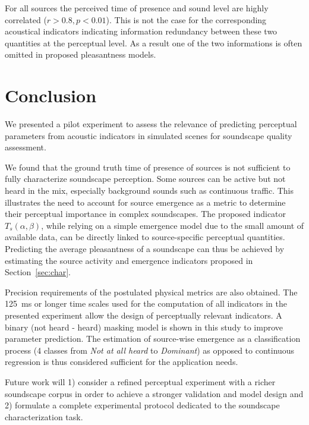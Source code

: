 \documentclass{article}
\begin{document}
\begin{sloppy}
For all sources the perceived time of presence and sound level are highly correlated ($r>0.8, p<0.01$). This is not the case for the corresponding acoustical indicators indicating information redundancy between these two quantities at the perceptual level. As a result one of the two informations is often omitted in proposed pleasantness models.

\section{Conclusion}
\label{sec:disc}

We presented a pilot experiment to assess the relevance of predicting perceptual parameters from acoustic indicators in simulated scenes for soundscape quality assessment.

We found that the ground truth time of presence of sources is not sufficient to fully characterize soundscape perception. Some sources can be active but not heard in the mix, especially background sounds such as continuous traffic. This illustrates the need to account for source emergence as a metric to determine their perceptual importance in complex soundscapes. The proposed indicator $T_s(\alpha, \beta)$, while relying on a simple emergence model due to the small amount of available data, can be directly linked to source-specific perceptual quantities. Predicting the average pleasantness of a soundscape can thus be achieved by estimating the source activity and emergence indicators proposed in Section~\ref{sec:char}.

Precision requirements of the postulated physical metrics are also obtained. The 125~ms or longer time scales used for the computation of all indicators in the presented experiment allow the design of perceptually relevant indicators. A binary (not heard - heard) masking model is shown in this study to improve parameter prediction. The estimation of source-wise emergence as a classification process (4 classes from \textit{Not at all heard} to \textit{Dominant}) as opposed to continuous regression is thus considered sufficient for the application needs.

Future work will 1) consider a refined perceptual experiment with a richer soundscape corpus in order to achieve a stronger validation and model design and 2) formulate a complete experimental protocol dedicated to the soundscape characterization task.


\end{sloppy}
\end{document}
